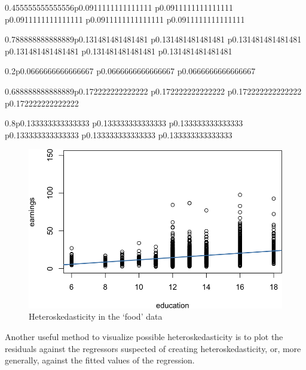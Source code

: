 \documentclass[]{book}
\newenvironment{Shaded}{\begin{snugshade}}{\end{snugshade}}
\newcommand{\DataTypeTok}[1]{\textcolor[rgb]{0.13,0.29,0.53}{#1}}
\newcommand{\KeywordTok}[1]{\textcolor[rgb]{0.13,0.29,0.53}{\textbf{#1}}}
\newcommand{\NormalTok}[1]{#1}
\newcommand{\OperatorTok}[1]{\textcolor[rgb]{0.81,0.36,0.00}{\textbf{#1}}}
\newcommand{\StringTok}[1]{\textcolor[rgb]{0.31,0.60,0.02}{#1}}
\begin{document}
\begin{tabularx}{0.455555555555556\textwidth}{p{} p{} p{} p{} p{}}
\begin{tabularx}{0.788888888888889\textwidth}{p{} p{} p{} p{} p{} p{}}
\begin{tabularx}{0.2\textwidth}{p{} p{} p{}}
\begin{tabularx}{0.688888888888889\textwidth}{p{} p{} p{} p{}}
\begin{tabularx}{0.8\textwidth}{p{} p{} p{} p{} p{} p{}}
\begin{figure}
{\centering \includegraphics[width=0.8\linewidth]{MEM5220_R_files/figure-latex/fig18-1} 

}

\caption{Heteroskedasticity in the ‘food’ data}\label{fig:fig18}
\end{figure}

Another useful method to visualize possible heteroskedasticity is to
plot the residuals against the regressors suspected of creating
heteroskedasticity, or, more generally, against the fitted values of the
regression.

\begin{Shaded}
\end{Shaded}

\begin{figure}


\end{figure}
\end{tabularx}
\end{tabularx}
\end{tabularx}
\end{tabularx}
\end{tabularx}
\end{document}
